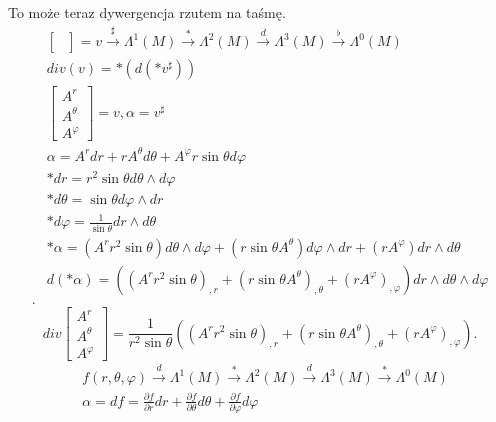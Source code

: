 \documentclass[../main.tex]{subfiles}
\begin{document}
\begin{przyklad}
    To może teraz dywergencja rzutem na taśmę.
    \begin{align*}
        &\begin{bmatrix} \\ \\  \end{bmatrix} = v \overset{\sharp}{\to} \Lambda^1(M) \overset{\ast}{\to} \Lambda^2(M) \overset{d}{\to} \Lambda^3(M) \overset{\flat}{\to} \Lambda^0 (M)  \\
        &div(v) = \ast\left( d(\ast v^\sharp) \right)\\
        &\begin{bmatrix} A^r\\ A^\theta\\ A^\varphi \end{bmatrix} = v, \alpha = v^\sharp\\
        &\alpha = A^r dr + r A^\theta d\theta + A^\varphi r \sin\theta d\varphi\\
        &\ast dr = r^2\sin\theta d\theta\land d\varphi\\
        &\ast d\theta = \sin\theta d\varphi\land dr\\
        &\ast d\varphi = \frac{1}{\sin\theta} dr\land d\theta\\
        &\ast \alpha = \left( A^r r^2 \sin\theta \right) d\theta \land d\varphi + \left( r \sin\theta A^\theta \right) d\varphi\land dr + \left( r A^\varphi \right) dr\land d\theta\\
        &d(\ast \alpha) = \left( (A^r r^2 \sin\theta)_{,r} + (r\sin\theta A^\theta)_{,\theta} + (r A^\varphi)_{,\varphi} \right) dr\land d\theta \land d\varphi\\
    .\end{align*}
    \[
        div \begin{bmatrix} A^r\\ A^\theta \\ A^\varphi \end{bmatrix} = \frac{1}{r^2\sin\theta} \left( (A^r r^2\sin\theta)_{,r} + (r\sin\theta A^\theta)_{,\theta} + (rA^\varphi)_{,\varphi} \right)
    .\]
    \begin{align*}
        &f(r,\theta,\varphi) \overset{d}{\to} \Lambda^1(M) \overset{\ast}{\to} \Lambda^2(M) \overset{d}{\to} \Lambda^3(M) \overset{\ast}{\to} \Lambda^0(M)\\
        &\alpha = df = \frac{\partial f}{\partial r} dr + \frac{\partial f}{\partial \theta} d\theta + \frac{\partial f}{\partial \varphi} d\varphi\\

\end{align*}
\end{przyklad}
\end{document}
